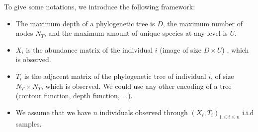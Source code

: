 To give some notations, we introduce the following framework:
\begin{itemize}
    \item The maximum depth of a phylogenetic tree is $D$, the maximum number of nodes $N_T$, and the maximum amount of unique species at any level is $U$.
    \item $X_i$ is the abundance matrix of the individual $i$ (image of size $D \times U$) , which is observed.
    \item $T_i$ is the adjacent matrix of the phylogenetic tree of individual $i$, of size $N_T \times N_T$, which is observed.
    We could use any other encoding of a tree (contour function, depth function, $\dots$).
    \item We assume that we have $n$ individuals observed through $(X_i, T_i)_{1 \leq i \leq n}$ i.i.d samples.
\end{itemize}
